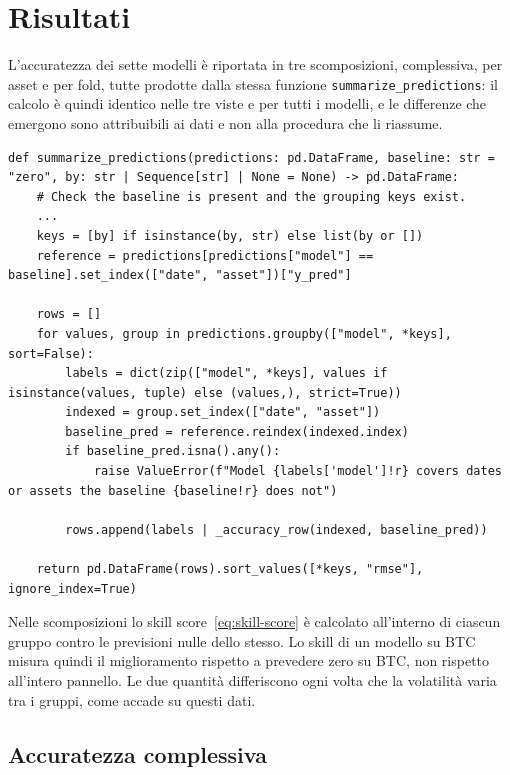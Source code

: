 \section{Risultati}
\label{sec:tc-results}

L'accuratezza dei sette modelli è riportata in tre scomposizioni, complessiva, per asset e per fold, tutte prodotte dalla stessa funzione \texttt{summarize\_predictions}: il calcolo è quindi identico nelle tre viste e per tutti i modelli, e le differenze che emergono sono attribuibili ai dati e non alla procedura che li riassume.

\begin{listing}[H]
\begin{verbatim}
def summarize_predictions(predictions: pd.DataFrame, baseline: str = "zero", by: str | Sequence[str] | None = None) -> pd.DataFrame:
    # Check the baseline is present and the grouping keys exist.
    ...
    keys = [by] if isinstance(by, str) else list(by or [])
    reference = predictions[predictions["model"] == baseline].set_index(["date", "asset"])["y_pred"]

    rows = []
    for values, group in predictions.groupby(["model", *keys], sort=False):
        labels = dict(zip(["model", *keys], values if isinstance(values, tuple) else (values,), strict=True))
        indexed = group.set_index(["date", "asset"])
        baseline_pred = reference.reindex(indexed.index)
        if baseline_pred.isna().any():
            raise ValueError(f"Model {labels['model']!r} covers dates or assets the baseline {baseline!r} does not")

        rows.append(labels | _accuracy_row(indexed, baseline_pred))

    return pd.DataFrame(rows).sort_values([*keys, "rmse"], ignore_index=True)
\end{verbatim}
\caption{\texttt{summarize\_predictions}}
\label{lst:summarize-predictions}
\end{listing}

Nelle scomposizioni lo skill score~\eqref{eq:skill-score} è calcolato all'interno di ciascun gruppo contro le previsioni nulle dello stesso. Lo skill di un modello su BTC misura quindi il miglioramento rispetto a prevedere zero su BTC, non rispetto all'intero pannello. Le due quantità differiscono ogni volta che la volatilità varia tra i gruppi, come accade su questi dati.

\subsection{Accuratezza complessiva}

